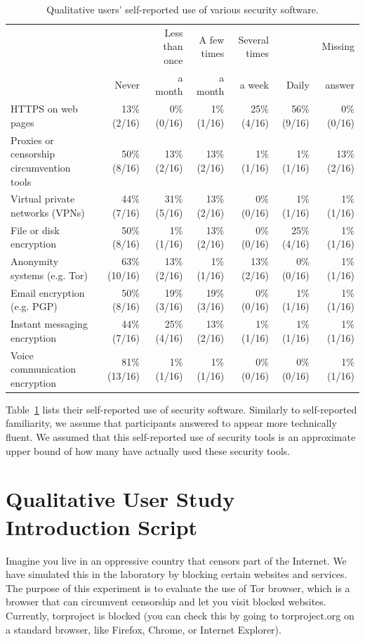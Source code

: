 \documentclass[USenglish,oneside,twocolumn]{article}
\begin{document}
\begin{table}[h]
\centering
\begin{tabular}{l r r r r r r}
& \multicolumn{1}{r}{} & \multicolumn{1}{r}{Less than once} & \multicolumn{1}{r}{A few times}& \multicolumn{1}{r}{Several times}& \multicolumn{1}{r}{} & \multicolumn{1}{r}{Missing}\\
& \multicolumn{1}{r}{Never} & \multicolumn{1}{r}{a month} & \multicolumn{1}{r}{a month}& \multicolumn{1}{r}{a week}& \multicolumn{1}{r}{Daily} & \multicolumn{1}{r}{answer}\\
\noalign{\hrule}
HTTPS on web pages				& 13\% (2/16) & 0\% (0/16) & 1\% (1/16) & 25\% (4/16) & 56\% (9/16) & 0\% (0/16) \\
Proxies or censorship circumvention tools & 50\% (8/16) & 13\% (2/16) & 13\% (2/16) & 1\% (1/16) & 1\% (1/16) & 13\% (2/16) \\
Virtual private networks (VPNs) 		& 44\% (7/16) & 31\% (5/16) & 13\% (2/16) & 0\% (0/16) & 1\% (1/16) & 1\% (1/16) \\
File or disk encryption 				& 50\% (8/16) & 1\% (1/16) & 13\% (2/16) & 0\% (0/16) & 25\% (4/16) & 1\% (1/16) \\
Anonymity systems (e.g. Tor) 			& 63\% (10/16) & 13\% (2/16) & 1\% (1/16) & 13\% (2/16) & 0\% (0/16) & 1\% (1/16) \\
Email encryption (e.g. PGP) 			& 50\% (8/16) & 19\% (3/16) & 19\% (3/16) & 0\% (0/16) & 1\% (1/16) & 1\% (1/16) \\
Instant messaging encryption 			& 44\% (7/16) & 25\% (4/16) & 13\% (2/16) & 1\% (1/16) & 1\% (1/16) & 1\% (1/16) \\
Voice communication encryption 		& 81\% (13/16) & 1\% (1/16) & 1\% (1/16) & 0\% (0/16) & 0\% (0/16) &1\% (1/16)\\
\end{tabular}
\caption{
Qualitative users' self-reported use of various security software. 
}
\label{table:selfreported-software}
\end{table}

Table~\ref{table:selfreported-software} lists their self-reported use of security software. Similarly to self-reported familiarity, we assume that participants answered to appear more technically fluent. We assumed that this self-reported use of security tools is an approximate upper bound of how many have actually used these security tools.

\section{Qualitative User Study Introduction Script} 
\label{qualitative-script} 
Imagine you live in an oppressive country that censors part of the Internet. We have simulated this in the laboratory by blocking certain websites and services.  The purpose of this experiment is to evaluate the use of Tor browser, which is a browser that can circumvent censorship and let you visit blocked websites. Currently, torproject is blocked (you can check this by going to torproject.org on a standard browser, like Firefox, Chrome, or Internet Explorer). 
\end{document}
